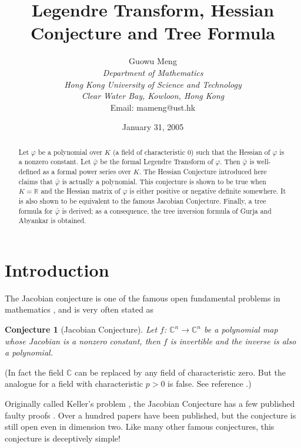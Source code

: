 \documentclass{article}
\newcommand{\bb}{\mathbb}
\newtheorem{conjecture}[defn]{Conjecture}
\newtheorem{main theorem}[defn]{Main Theorem}
\begin{document}
\title{Legendre Transform, Hessian Conjecture and Tree Formula}
\author{Guowu Meng\\ \small{\it Department of Mathematics}\\ \small{\it Hong Kong University of Science and Technology}\\
\small{\it Clear Water Bay, Kowloon, Hong Kong}\\
\small{Email: mameng@ust.hk}}
\date{January 31, 2005}
\maketitle

\begin{abstract}
Let $\varphi$ be a polynomial over $K$ (a field of characteristic
$0$) such that the Hessian of $\varphi$ is a nonzero constant. Let
$\bar\varphi$ be the formal Legendre Transform of $\varphi$. Then
$\bar\varphi$ is well-defined as a formal power series over $K$.
The Hessian Conjecture introduced here claims that $\bar\varphi$
is actually a polynomial. This conjecture is shown to be true when
$K=\bb{R}$ and the Hessian matrix of $\varphi$ is either positive
or negative definite somewhere. It is also shown to be equivalent
to the famous Jacobian Conjecture. Finally, a tree formula for
$\bar\varphi$ is derived; as a consequence, the tree inversion
formula of Gurja and Abyankar is obtained.
\end{abstract}


\section{Introduction}
The Jacobian conjecture is one of the famous open fundamental problems
in mathematics \cite{Sma98}, and is very often stated as
\begin{conjecture}[Jacobian Conjecture]  Let $f$: $\bb{C}^n\rightarrow \bb{C}^n$
be a polynomial map whose
Jacobian is a nonzero constant, then $f$ is invertible and the
inverse is also a polynomial.
\end{conjecture}
(In fact the field $\bb{C}$ can be replaced by any field of
characteristic zero. But the analogue for a field with
characteristic $p>0$ is false. See reference \cite{BCW82}.)

Originally called Keller's problem \cite{Kel39}, the Jacobian
Conjecture  has a few published faulty proofs \cite{Eng55,
Seg56-57, Seg56, Seg60}. Over a hundred papers have been
published, but the conjecture is still open even in dimension two.
Like many other famous conjectures, this conjecture is deceptively
simple!
\end{document}
